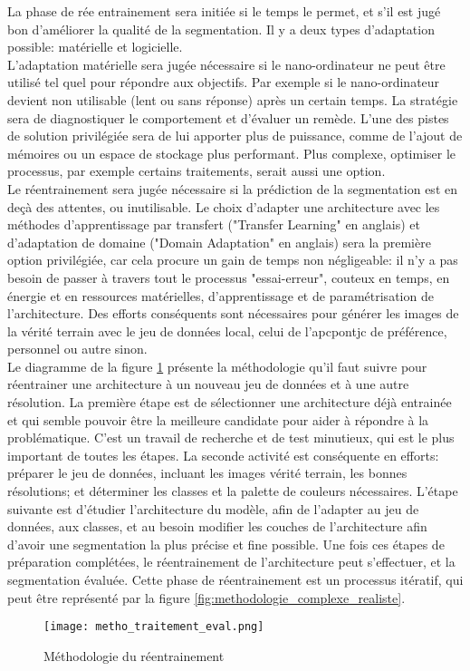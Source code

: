 ﻿\noindent La phase de rée entrainement sera initiée si le temps le permet, et s'il est jugé bon d'améliorer la qualité de la segmentation. Il y a deux types d'adaptation possible: matérielle et logicielle.
\vspace{\baselineskip}
\\
\noindent L'adaptation matérielle sera jugée nécessaire si le nano-ordinateur ne peut être utilisé tel quel pour répondre aux objectifs. Par exemple si le nano-ordinateur devient non utilisable (lent ou sans réponse) après un certain temps. La stratégie sera de diagnostiquer le comportement et d'évaluer un remède. L'une des pistes de solution privilégiée sera de lui apporter plus de puissance, comme de l'ajout de mémoires ou un espace de stockage plus performant. Plus complexe, optimiser le processus, par exemple certains traitements, serait aussi une option.
\vspace{\baselineskip}
\\
\noindent Le réentrainement sera jugée nécessaire si la prédiction de la segmentation est en deçà des attentes, ou inutilisable. Le choix d'adapter une architecture avec les méthodes d'apprentissage par transfert ("Transfer Learning" en anglais) et d'adaptation de domaine ("Domain Adaptation" en anglais) sera la première option privilégiée, car cela procure un gain de temps non négligeable: il n'y a pas besoin de passer à travers tout le processus "essai-erreur", couteux en temps, en énergie et en ressources matérielles, d'apprentissage et de paramétrisation de l'architecture. Des efforts conséquents sont nécessaires pour générer les images de la vérité terrain avec le jeu de données local, celui de l'\acrshort{apcpontjc} de préférence, personnel ou autre sinon.
\vspace{\baselineskip}
\\
\noindent Le diagramme de la figure \ref{fig:metho_adaptation} présente la méthodologie qu'il faut suivre pour réentrainer une architecture à un nouveau jeu de données et à une autre résolution. La première étape est de sélectionner une architecture déjà entrainée et qui semble pouvoir être la meilleure candidate pour aider à répondre à la problématique. C'est un travail de recherche et de test minutieux, qui est le plus important de toutes les étapes. La seconde activité est conséquente en efforts: préparer le jeu de données, incluant les images vérité terrain, les bonnes résolutions; et déterminer les classes et la palette de couleurs nécessaires. L'étape suivante est d'étudier l'architecture du modèle, afin de l'adapter au jeu de données, aux classes, et au besoin modifier les couches de l'architecture afin d'avoir une segmentation la plus précise et fine possible. Une fois ces étapes de préparation complétées, le réentrainement de l'architecture peut s'effectuer, et la segmentation évaluée. Cette phase de réentrainement est un processus itératif, qui peut être représenté par la figure \ref{fig:methodologie_complexe_realiste}.
\label{metho_adaptation}
\begin{figure}[H]
    \centering
    \texttt{[image: metho\_traitement\_eval.png]}
    \caption{Méthodologie du réentrainement}
    \label{fig:metho_adaptation}
\end{figure}